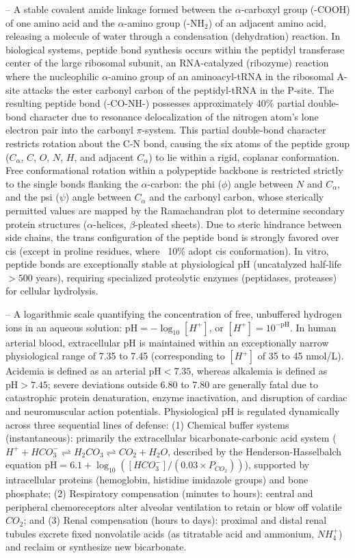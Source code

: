 -- A stable covalent amide linkage formed between the $\alpha$-carboxyl group (-COOH) of one amino acid and the $\alpha$-amino group (-NH$_2$) of an adjacent amino acid, releasing a molecule of water through a condensation (dehydration) reaction. In biological systems, peptide bond synthesis occurs within the peptidyl transferase center of the large ribosomal subunit, an RNA-catalyzed (ribozyme) reaction where the nucleophilic $\alpha$-amino group of an aminoacyl-tRNA in the ribosomal A-site attacks the ester carbonyl carbon of the peptidyl-tRNA in the P-site. The resulting peptide bond (-CO-NH-) possesses approximately 40\% partial double-bond character due to resonance delocalization of the nitrogen atom's lone electron pair into the carbonyl $\pi$-system. This partial double-bond character restricts rotation about the C-N bond, causing the six atoms of the peptide group ($C_\alpha$, $C$, $O$, $N$, $H$, and adjacent $C_\alpha$) to lie within a rigid, coplanar conformation. Free conformational rotation within a polypeptide backbone is restricted strictly to the single bonds flanking the $\alpha$-carbon: the phi ($\phi$) angle between $N$ and $C_\alpha$, and the psi ($\psi$) angle between $C_\alpha$ and the carbonyl carbon, whose sterically permitted values are mapped by the Ramachandran plot to determine secondary protein structures ($\alpha$-helices, $\beta$-pleated sheets). Due to steric hindrance between side chains, the trans configuration of the peptide bond is strongly favored over cis (except in proline residues, where ~10\% adopt cis conformation). In vitro, peptide bonds are exceptionally stable at physiological pH (uncatalyzed half-life $>500$ years), requiring specialized proteolytic enzymes (peptidases, proteases) for cellular hydrolysis.

-- A logarithmic scale quantifying the concentration of free, unbuffered hydrogen ions in an aqueous solution: $\text{pH} = -\log_{10}[H^+]$, or $[H^+] = 10^{-\text{pH}}$. In human arterial blood, extracellular pH is maintained within an exceptionally narrow physiological range of 7.35 to 7.45 (corresponding to $[H^+]$ of 35 to 45 nmol/L). Acidemia is defined as an arterial $\text{pH} < 7.35$, whereas alkalemia is defined as $\text{pH} > 7.45$; severe deviations outside 6.80 to 7.80 are generally fatal due to catastrophic protein denaturation, enzyme inactivation, and disruption of cardiac and neuromuscular action potentials. Physiological pH is regulated dynamically across three sequential lines of defense: (1) Chemical buffer systems (instantaneous): primarily the extracellular bicarbonate-carbonic acid system ($H^+ + HCO_3^- \rightleftharpoons H_2CO_3 \rightleftharpoons CO_2 + H_2O$, described by the Henderson-Hasselbalch equation $\text{pH} = 6.1 + \log_{10}([HCO_3^-] / (0.03 \times P_{CO_2}))$), supported by intracellular proteins (hemoglobin, histidine imidazole groups) and bone phosphate; (2) Respiratory compensation (minutes to hours): central and peripheral chemoreceptors alter alveolar ventilation to retain or blow off volatile $CO_2$; and (3) Renal compensation (hours to days): proximal and distal renal tubules excrete fixed nonvolatile acids (as titratable acid and ammonium, $NH_4^+$) and reclaim or synthesize new bicarbonate.

